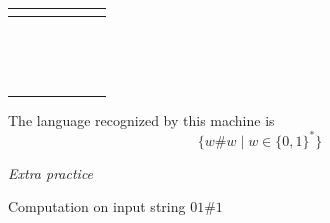\documentclass[12pt, oneside]{article}
\begin{document}
\begin{multicols}{2}
\begin{tabular}{|c|c|c|c|c|c|c|}
  \hline
  \multicolumn{7}{|c|}{\phantom{A}}\\
  \hline
  \phantom{AA} & \phantom{AA}& \phantom{AA}& \phantom{AA}& \phantom{AA}& \phantom{AA}& \phantom{AA} \\
  \hline
  \multicolumn{7}{|c|}{\phantom{A}}\\
  \hline
  \phantom{AA} & \phantom{AA}& \phantom{AA}& \phantom{AA}& \phantom{AA}& \phantom{AA}& \phantom{AA} \\
  \hline
  \multicolumn{7}{|c|}{\phantom{A}}\\
  \hline
  \phantom{AA} & \phantom{AA}& \phantom{AA}& \phantom{AA}& \phantom{AA}& \phantom{AA}& \phantom{AA} \\
  \hline
  \multicolumn{7}{|c|}{\phantom{A}}\\
  \hline
  \phantom{AA} & \phantom{AA}& \phantom{AA}& \phantom{AA}& \phantom{AA}& \phantom{AA}& \phantom{AA} \\
  \hline
  \multicolumn{7}{|c|}{\phantom{A}}\\
  \hline
  \phantom{AA} & \phantom{AA}& \phantom{AA}& \phantom{AA}& \phantom{AA}& \phantom{AA}& \phantom{AA} \\
  \hline
  \multicolumn{7}{|c|}{\phantom{A}}\\
  \hline
  \phantom{AA} & \phantom{AA}& \phantom{AA}& \phantom{AA}& \phantom{AA}& \phantom{AA}& \phantom{AA} \\
  \hline
  \multicolumn{7}{|c|}{\phantom{A}}\\
  \hline
  \phantom{AA} & \phantom{AA}& \phantom{AA}& \phantom{AA}& \phantom{AA}& \phantom{AA}& \phantom{AA} \\
  \hline
  \multicolumn{7}{|c|}{\phantom{A}}\\
  \hline
  \phantom{AA} & \phantom{AA}& \phantom{AA}& \phantom{AA}& \phantom{AA}& \phantom{AA}& \phantom{AA} \\
  \hline
  \end{tabular}
\end{multicols}


The language recognized by this machine is
\[
  \{ w \# w \mid w \in \{0,1\}^* \}
\]

\newpage
{\it Extra practice}

Computation on  input  string  $01\#1$
\end{document}
